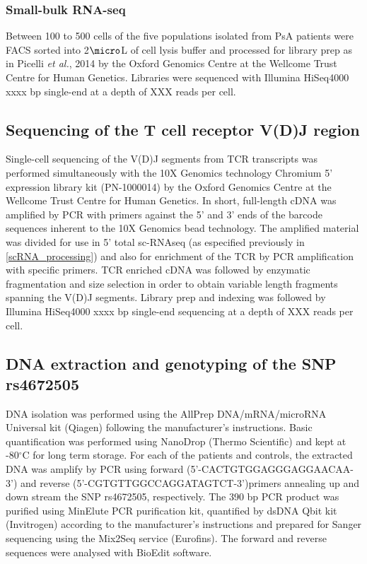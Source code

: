 \subsubsection{Small-bulk RNA-seq } 
Between 100 to 500 cells of the five populations isolated from PsA patients were FACS sorted into 2$\micro$L of cell lysis buffer and processed for library prep as in Picelli \textit{et al.}, 2014 by the Oxford Genomics Centre at the Wellcome Trust Centre for Human Genetics. Libraries were sequenced with Illumina HiSeq4000 xxxx bp single-end at a depth of XXX reads per cell.


\subsection{Sequencing of the T cell receptor V(D)J region}
Single-cell sequencing of the V(D)J segments from TCR transcripts was performed simultaneously with the 10X Genomics technology Chromium 5' expression library kit (PN-1000014) by the Oxford Genomics Centre at the Wellcome Trust Centre for Human Genetics. In short, full-length cDNA was amplified by PCR with primers against the 5’ and 3’ ends of the barcode sequences inherent to the 10X Genomics bead technology. The amplified material was divided for use in 5' total sc-RNAseq (as especified previously in \ref{scRNA_processing}) and also for enrichment of the TCR by PCR amplification with specific primers. TCR enriched cDNA was followed by enzymatic fragmentation and size selection in order to obtain variable length fragments spanning the V(D)J segments. Library prep and indexing was followed by Illumina HiSeq4000 xxxx bp single-end sequencing at a depth of XXX reads per cell.

\subsection{DNA extraction and genotyping of the SNP rs4672505}
DNA isolation was performed using the AllPrep DNA/mRNA/microRNA Universal kit (Qiagen) following the manufacturer's instructions. Basic quantification was performed using NanoDrop (Thermo Scientific) and kept at -80{$^\circ$}C for long term storage. For each of the patients and controls, the extracted DNA was amplify by PCR using forward (5'-CACTGTGGAGGGAGGAACAA-3') and reverse (5'-CGTGTTGGCCAGGATAGTCT-3')primers annealing up and down stream the SNP rs4672505, respectively. The 390 bp PCR product was purified using MinElute PCR purification kit, quantified by dsDNA Qbit kit (Invitrogen) according to the manufacturer's instructions and prepared for Sanger sequencing using the Mix2Seq service (Eurofins). The forward and reverse sequences were analysed with BioEdit software.






